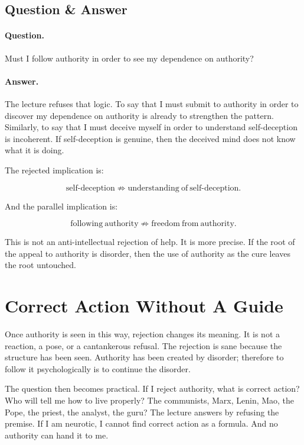 \subsection{Question \& Answer}

\paragraph{Question.}
Must I follow authority in order to see my dependence on authority?

\paragraph{Answer.}
The lecture refuses that logic. To say that I must submit to authority in order to discover my dependence on authority is already to strengthen the pattern. Similarly, to say that I must deceive myself in order to understand self-deception is incoherent. If self-deception is genuine, then the deceived mind does not know what it is doing.

The rejected implication is:

\begin{equation}
\mathrm{self\mbox{-}deception}
\not\Rightarrow
\mathrm{understanding\ of\ self\mbox{-}deception}.
\end{equation}

And the parallel implication is:

\begin{equation}
\mathrm{following\ authority}
\not\Rightarrow
\mathrm{freedom\ from\ authority}.
\end{equation}

This is not an anti-intellectual rejection of help. It is more precise. If the root of the appeal to authority is disorder, then the use of authority as the cure leaves the root untouched.

\section{Correct Action Without A Guide}

Once authority is seen in this way, rejection changes its meaning. It is not a reaction, a pose, or a cantankerous refusal. The rejection is sane because the structure has been seen. Authority has been created by disorder; therefore to follow it psychologically is to continue the disorder.

The question then becomes practical. If I reject authority, what is correct action? Who will tell me how to live properly? The communists, Marx, Lenin, Mao, the Pope, the priest, the analyst, the guru? The lecture answers by refusing the premise. If I am neurotic, I cannot find correct action as a formula. And no authority can hand it to me.

